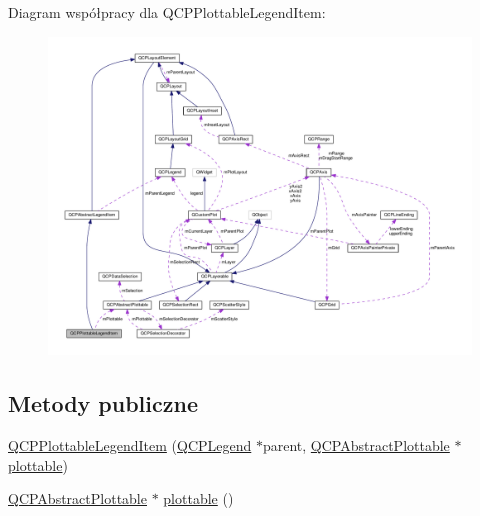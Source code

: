Diagram współpracy dla Q\+C\+P\+Plottable\+Legend\+Item\+:\nopagebreak
\begin{figure}[H]
\begin{center}
\leavevmode
\includegraphics[width=350pt]{class_q_c_p_plottable_legend_item__coll__graph}
\end{center}
\end{figure}
\subsection*{Metody publiczne}
\begin{DoxyCompactItemize}
\item 
\hyperlink{class_q_c_p_plottable_legend_item_ac1072591fe409d3dabad51b23ee4d6c5}{Q\+C\+P\+Plottable\+Legend\+Item} (\hyperlink{class_q_c_p_legend}{Q\+C\+P\+Legend} $\ast$parent, \hyperlink{class_q_c_p_abstract_plottable}{Q\+C\+P\+Abstract\+Plottable} $\ast$\hyperlink{class_q_c_p_plottable_legend_item_af29e9a2c60b4cba0cac2447b8af7b488}{plottable})
\item 
\hyperlink{class_q_c_p_abstract_plottable}{Q\+C\+P\+Abstract\+Plottable} $\ast$ \hyperlink{class_q_c_p_plottable_legend_item_af29e9a2c60b4cba0cac2447b8af7b488}{plottable} ()
\end{DoxyCompactItemize}
